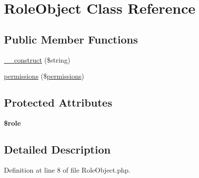 \hypertarget{classcommon_1_1user_1_1legacy_1_1_role_object}{\section{\-Role\-Object \-Class \-Reference}
\label{classcommon_1_1user_1_1legacy_1_1_role_object}
}
\subsection*{\-Public \-Member \-Functions}
\begin{DoxyCompactItemize}
\item 
\hyperlink{classcommon_1_1user_1_1legacy_1_1_role_object_a86d355bfc3694145c81bf7ba65d3cded}{\-\_\-\-\_\-construct} (\$string)
\item 
\hyperlink{classcommon_1_1user_1_1legacy_1_1_role_object_ae0c158f2382ab0c7907921033ccee749}{permissions} (\$\hyperlink{classcommon_1_1user_1_1legacy_1_1_role_object_ae0c158f2382ab0c7907921033ccee749}{permissions})
\end{DoxyCompactItemize}
\subsection*{\-Protected \-Attributes}
\begin{DoxyCompactItemize}
\item 
\hypertarget{classcommon_1_1user_1_1legacy_1_1_role_object_a1ea903cca285c7c0b4c9203932100309}{{\bfseries \$role}}\label{classcommon_1_1user_1_1legacy_1_1_role_object_a1ea903cca285c7c0b4c9203932100309}

\end{DoxyCompactItemize}


\subsection{\-Detailed \-Description}


\-Definition at line 8 of file \-Role\-Object.\-php.



